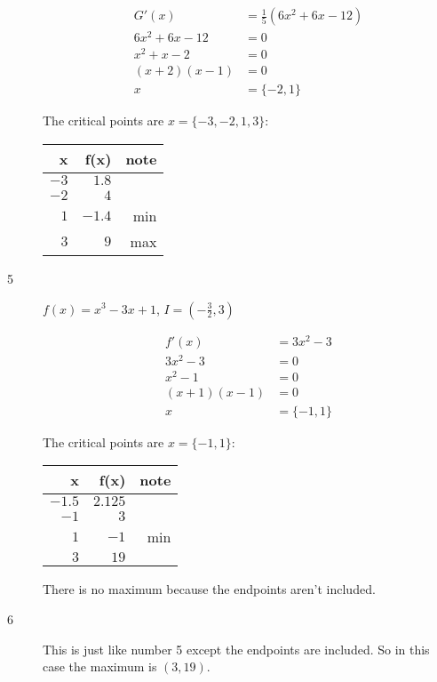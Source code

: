 \documentclass[fleqn]{exam}
\begin{document}
\begin{description}
\begin{align*}
  G'(x) &= \frac{1}{5}(6x^2 + 6x - 12) \\
  6x^2 + 6x - 12 &= 0 \\
  x^2 + x - 2 &= 0 \\
  (x + 2)(x - 1) &= 0 \\
  x &= \{-2, 1\}
\end{align*}

The critical points are $x = \{-3, -2, 1, 3 \}$:

\begin{tabular}{rrr}
\toprule
x   & f(x) & note \\
\midrule
$-3$            &  $1.8$        &  \\
$-2$            &  $4$          &   \\
$1$             &  $-1.4$       &  min \\
$3$             &  $9$          &  max \\
\bottomrule
\end{tabular}

\pagebreak

\item[5] 
$f(x) = x^3 - 3x + 1$, $I = \left(-\frac{3}{2}, 3 \right)$

\begin{align*}
  f'(x) &= 3x^2 - 3 \\
  3x^2 - 3 &= 0 \\
  x^2 - 1  &= 0 \\
  (x + 1)(x - 1) &= 0 \\
  x &= \{-1, 1\}
\end{align*}

The critical points are $x = \{ -1, 1 \}$:

\begin{tabular}{rrr}
\toprule
x   & f(x) & note \\
\midrule
$-1.5$ &  $2.125$ &  \\
$-1$   &  $3$     &  \\
$1$    &  $-1$    &   min \\
$3$    &  $19$    &   \\
\bottomrule
\end{tabular}

There is no maximum because the endpoints aren't included.

\item[6]
This is just like number 5 except the endpoints are included.  So in this case the maximum is $(3, 19)$.


\end{description}
\end{document}
